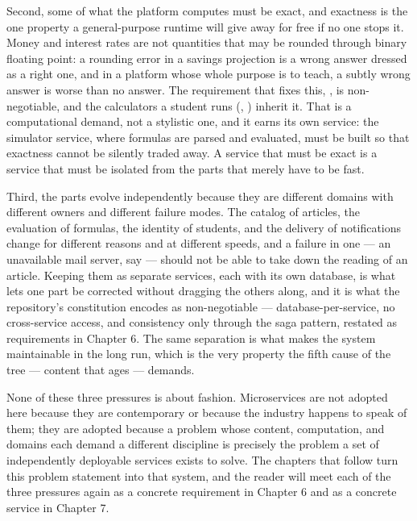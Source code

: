 Second, some of what the platform computes must be exact, and exactness is the
one property a general-purpose runtime will give away for free if no one stops
it. Money and interest rates are not quantities that may be rounded through
binary floating point: a rounding error in a savings projection is a wrong
answer dressed as a right one, and in a platform whose whole purpose is to
teach, a subtly wrong answer is worse than no answer. The requirement that
fixes this, , is non-negotiable, and the calculators a student
runs (, ) inherit it. That is a computational
demand, not a stylistic one, and it earns its own service: the simulator
service, where formulas are parsed and evaluated, must be built so that
exactness cannot be silently traded away. A service that must be exact is a
service that must be isolated from the parts that merely have to be fast.

Third, the parts evolve independently because they are different domains with
different owners and different failure modes. The catalog of articles, the
evaluation of formulas, the identity of students, and the delivery of
notifications change for different reasons and at different speeds, and a
failure in one --- an unavailable mail server, say --- should not be able to
take down the reading of an article. Keeping them as separate services, each
with its own database, is what lets one part be corrected without dragging the
others along, and it is what the repository's constitution encodes as
non-negotiable --- database-per-service, no cross-service access, and
consistency only through the saga pattern, restated as requirements in
Chapter 6. The same separation is what makes the system maintainable in the
long run, which is the very property the fifth cause of the tree --- content
that ages --- demands.

None of these three pressures is about fashion. Microservices are not adopted
here because they are contemporary or because the industry happens to speak of
them; they are adopted because a problem whose content, computation, and
domains each demand a different discipline is precisely the problem a set of
independently deployable services exists to solve. The chapters that follow
turn this problem statement into that system, and the reader will meet each of
the three pressures again as a concrete requirement in Chapter 6 and as a
concrete service in Chapter 7.
